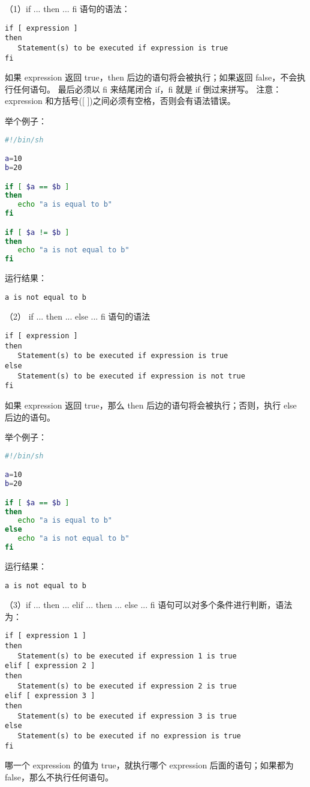 （1）if ... then ... fi 语句的语法：
\begin{verbatim}
if [ expression ]
then
   Statement(s) to be executed if expression is true
fi
\end{verbatim}

如果 expression 返回 true，then 后边的语句将会被执行；如果返回 false，不会执行任何语句。
最后必须以 fi 来结尾闭合 if，fi 就是 if 倒过来拼写。
注意：expression 和方括号([ ])之间必须有空格，否则会有语法错误。

举个例子：
\begin{lstlisting}[language=sh]
#!/bin/sh

a=10
b=20

if [ $a == $b ]
then
   echo "a is equal to b"
fi

if [ $a != $b ]
then
   echo "a is not equal to b"
fi
\end{lstlisting}
运行结果：

\verb|a is not equal to b|

（2） if ... then ... else ... fi 语句的语法
\begin{verbatim}
if [ expression ]
then
   Statement(s) to be executed if expression is true
else
   Statement(s) to be executed if expression is not true
fi
\end{verbatim}

如果 expression 返回 true，那么 then 后边的语句将会被执行；否则，执行 else 后边的语句。

举个例子：
\begin{lstlisting}[language=sh]
#!/bin/sh

a=10
b=20

if [ $a == $b ]
then
   echo "a is equal to b"
else
   echo "a is not equal to b"
fi
\end{lstlisting}
运行结果：

\verb|a is not equal to b|


（3）if ... then ... elif ... then ... else ... fi 语句可以对多个条件进行判断，语法为：
\begin{verbatim}
if [ expression 1 ]
then
   Statement(s) to be executed if expression 1 is true
elif [ expression 2 ]
then
   Statement(s) to be executed if expression 2 is true
elif [ expression 3 ]
then
   Statement(s) to be executed if expression 3 is true
else
   Statement(s) to be executed if no expression is true
fi
\end{verbatim}

哪一个 expression 的值为 true，就执行哪个 expression 后面的语句；如果都为 false，那么不执行任何语句。

